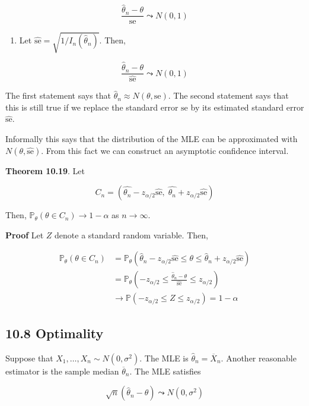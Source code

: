 \[ \frac{\hat{\theta}_n - \theta}{\text{se}} \leadsto N(0, 1) \]

\begin{enumerate}[tightlist,label={\arabic*.}]
\item
  Let \(\hat{\text{se}} = \sqrt{1 / I_n(\hat{\theta}_n)}\). Then,
\end{enumerate}

\[ \frac{\hat{\theta}_n - \theta}{\hat{\text{se}}} \leadsto N(0, 1) \]

The first statement says that
\(\hat{\theta}_n \approx N(\theta, \text{se})\). The second statement
says that this is still true if we replace the standard error
\(\text{se}\) by its estimated standard error \(\hat{\text{se}}\).

Informally this says that the distribution of the MLE can be
approximated with \(N(\theta, \hat{\text{se}})\). From this fact we can
construct an asymptotic confidence interval.

\textbf{Theorem 10.19}. Let

\[ C_n = \left( \hat{\theta_n} - z_{\alpha/2} \hat{\text{se}}, \; \hat{\theta_n} + z_{\alpha/2} \hat{\text{se}} \right) \]

Then, \(\mathbb{P}_\theta(\theta \in C_n) \rightarrow 1 - \alpha\) as
\(n \rightarrow \infty\).

\textbf{Proof} Let \(Z\) denote a standard random variable. Then,

\begin{align}
\mathbb{P}_\theta(\theta \in C_n) 
&= \mathbb{P}_\theta(\hat{\theta}_n - z_{\alpha/2} \hat{\text{se}} \leq \theta \leq \hat{\theta}_n + z_{\alpha/2} \hat{\text{se}}) \\
&= \mathbb{P}_\theta(-z_{\alpha/2} \leq \frac{\hat{\theta}_n - \theta}{\hat{\text{se}}} \leq z_{\alpha/2}) \\
&\rightarrow \mathbb{P}(-z_{\alpha/2} \leq Z \leq z_{\alpha/2}) = 1 - \alpha
\end{align}

\subsection{10.8 Optimality}\label{optimality}

Suppose that \(X_1, \dots, X_n \sim N(0, \sigma^2)\). The MLE is
\(\hat{\theta}_n = \overline{X}_n\). Another reasonable estimator is the
sample median \(\overline{\theta}_n\). The MLE satisfies

\[ \sqrt{n}(\hat{\theta}_n - \theta) \leadsto N(0, \sigma^2) \]

